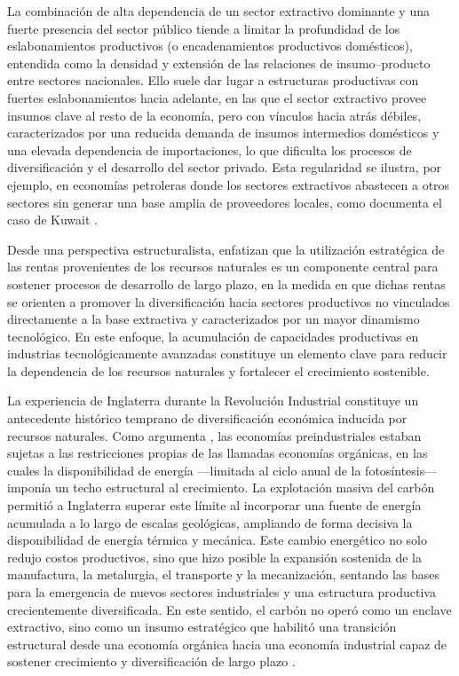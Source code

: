 \documentclass[../../TFM.tex]{subfiles}
\begin{document}
	La combinación de alta dependencia de un sector extractivo dominante y una fuerte presencia del sector público tiende a limitar la profundidad de los eslabonamientos productivos (o encadenamientos productivos domésticos), entendida como la densidad y extensión de las relaciones de insumo--producto entre sectores nacionales. Ello suele dar lugar a estructuras productivas con fuertes eslabonamientos hacia adelante, en las que el sector extractivo provee insumos clave al resto de la economía, pero con vínculos hacia atrás débiles, caracterizados por una reducida demanda de insumos intermedios domésticos y una elevada dependencia de importaciones, lo que dificulta los procesos de diversificación y el desarrollo del sector privado. Esta regularidad se ilustra, por ejemplo, en economías petroleras donde los sectores extractivos abastecen a otros sectores sin generar una base amplia de proveedores locales, como documenta el caso de Kuwait \parencite{Gelan2021}.
	
	Desde una perspectiva estructuralista, \textcite{Chang2007} enfatizan que la utilización estratégica de las rentas provenientes de los recursos naturales es un componente central para sostener procesos de desarrollo de largo plazo, en la medida en que dichas rentas se orienten a promover la diversificación hacia sectores productivos no vinculados directamente a la base extractiva y caracterizados por un mayor dinamismo tecnológico. En este enfoque, la acumulación de capacidades productivas en industrias tecnológicamente avanzadas constituye un elemento clave para reducir la dependencia de los recursos naturales y fortalecer el crecimiento sostenible.	
	
	La experiencia de Inglaterra durante la Revolución Industrial constituye un antecedente histórico temprano de diversificación económica inducida por recursos naturales. Como argumenta \textcite{Wrigley2013}, las economías preindustriales estaban sujetas a las restricciones propias de las llamadas economías orgánicas, en las cuales la disponibilidad de energía —limitada al ciclo anual de la fotosíntesis— imponía un techo estructural al crecimiento. La explotación masiva del carbón permitió a Inglaterra superar este límite al incorporar una fuente de energía acumulada a lo largo de escalas geológicas, ampliando de forma decisiva la disponibilidad de energía térmica y mecánica. Este cambio energético no solo redujo costos productivos, sino que hizo posible la expansión sostenida de la manufactura, la metalurgia, el transporte y la mecanización, sentando las bases para la emergencia de nuevos sectores industriales y una estructura productiva crecientemente diversificada. En este sentido, el carbón no operó como un enclave extractivo, sino como un insumo estratégico que habilitó una transición estructural desde una economía orgánica hacia una economía industrial capaz de sostener crecimiento y diversificación de largo plazo \parencite{Wrigley2013}.
	
\end{document}
